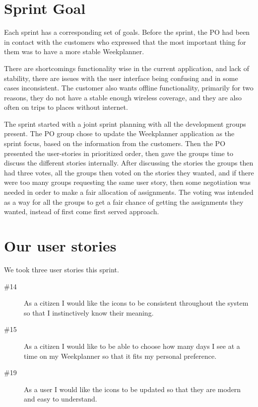 \section{Sprint Goal}

Each sprint has a corresponding set of goals. Before the sprint, the \gls{PO} had been in contact with the customers who expressed that the most important thing for them was to have a more stable Weekplanner.

There are shortcomings functionality wise in the current application, and lack of stability, there are issues with the user interface being confusing and in some cases inconsistent. The customer also wants offline functionality, primarily for two reasons, they do not have a stable enough wireless coverage, and they are also often on trips to places without internet.

The sprint started with a joint sprint planning with all the development groups present. The \gls{PO} group chose to update the Weekplanner application as the sprint focus, based on the information from the customers. Then the \gls{PO} presented the user-stories in prioritized order, then gave the groups time to discuss the different stories internally. After discussing the stories the groups then had three votes, all the groups then voted on the stories they wanted, and if there were too many groups requesting the same user story, then some negotiation was needed in order to make a fair allocation of assignments. The voting was intended as a way for all the groups to get a fair chance of getting the assignments they wanted, instead of first come first served approach.

\section{Our user stories}
We took three user stories this sprint.
\begin{description}
    \item [\#14] As a citizen I would like the icons to be consistent throughout the system so that I instinctively know their meaning.
    \item [\#15] As a citizen I would like to be able to choose how many days I see at a time on my Weekplanner so that it fits my personal preference.
    \item [\#19] As a user I would like the icons to be updated so that they are modern and easy to understand.
\end{description}

